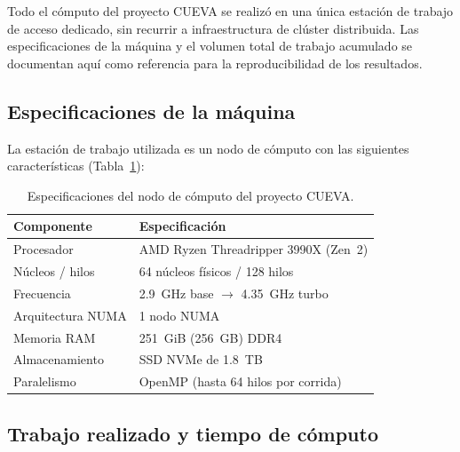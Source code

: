 
\primerparrafo Todo el cómputo del proyecto CUEVA se realizó en una única estación de trabajo de acceso dedicado, sin recurrir a infraestructura de clúster distribuida. Las especificaciones de la máquina y el volumen total de trabajo acumulado se documentan aquí como referencia para la reproducibilidad de los resultados.

\subsection{Especificaciones de la máquina}
\label{ap:computo:maquina}

\primerparrafo La estación de trabajo utilizada es un nodo de cómputo con las siguientes características (Tabla~\ref{ap:tab:maquina}):

\begin{table}[H]\centering\small
\caption{Especificaciones del nodo de cómputo del proyecto CUEVA.}
\label{ap:tab:maquina}
\begin{tabular}{ll}
\hline
\textbf{Componente}   & \textbf{Especificación} \\
\hline
Procesador        & AMD Ryzen Threadripper 3990X (Zen~2) \\
Núcleos / hilos   & 64 núcleos físicos / 128 hilos \\
Frecuencia        & 2.9~GHz base $\rightarrow$ 4.35~GHz turbo \\
Arquitectura NUMA & 1 nodo NUMA \\
Memoria RAM       & 251~GiB (256~GB) DDR4 \\
Almacenamiento    & SSD NVMe de 1.8~TB \\
Paralelismo       & OpenMP (hasta 64 hilos por corrida) \\
\hline
\end{tabular}
\end{table}

\subsection{Trabajo realizado y tiempo de cómputo}
\label{ap:computo:trabajo}

